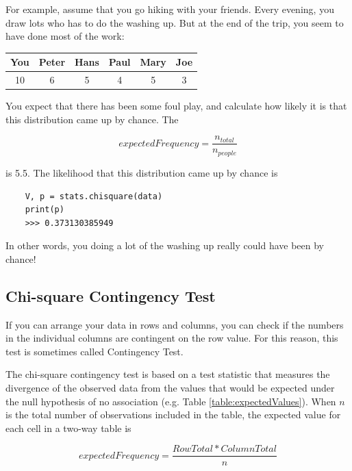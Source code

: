 For example, assume that you go hiking with your friends. Every evening, you draw lots who has to do the washing up.
But at the end of the trip, you seem to have done most of the work:

\begin{table}[h]
    \centering
    \begin{tabular}{c|c|c|c|c|c}
      You & Peter & Hans & Paul & Mary & Joe \\
      \hline
      10 & 6 & 5 & 4 & 5 & 3 \\
    \end{tabular}
\end{table}

You expect that there has been some foul play, and calculate how likely it is that this distribution came up by chance. The

\begin{equation}
  expectedFrequency = \frac{n_{total}}{n_{people}}
\end{equation}

is 5.5. The likelihood that this distribution came up by chance is

\begin{lstlisting}
    V, p = stats.chisquare(data)
    print(p)
    >>> 0.373130385949
\end{lstlisting}

In other words, you doing a lot of the washing up really could have been by chance!

\subsection{Chi-square Contingency Test} 

If you can arrange your data in rows and columns, you can check if the numbers in the individual columns are contingent on the row value. For this reason, this test is sometimes called Contingency Test.

The chi-square contingency test is based on a test statistic that measures the divergence of the observed data from the values that would be expected under the null hypothesis of no association (e.g. Table \ref{table:expectedValues}). When $n$ is the total number of observations included in the table, the expected value for each cell in a two-way table is

\begin{equation}
  expectedFrequency = \frac{RowTotal * ColumnTotal}{n}
\end{equation}


